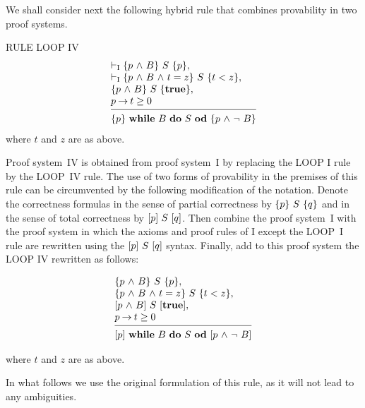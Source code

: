 \documentclass[runningheads]{llncs}       %
\begin{document}
We shall consider next the following hybrid rule that combines provability in two
proof systems.
\III

\NI
RULE LOOP IV
\[
 \begin{array}{l}
  \vdash_{\rm{I}}  \HT{p \A B}{S}{p},             \\
  \vdash_{\rm{I}}   \HT{p \A B \A t=z}{S}{t<z},   \\
  \HT{p \A B}{S}{\mathbf{true}},                  \\
  p \ra t \geq 0                                 \\
  [-\medskipamount]
  \hrulefill                                      \\
  \HT{p}{\WDD{B}{S}}{p \A \neg\ B}
 \end{array}
\]
%
\NI
where $t$ and $z$ are as above.
\III

Proof system~IV is obtained from proof system~I by replacing the LOOP
I rule by the LOOP~IV rule. The use of two forms of provability in the
premises of this rule can be circumvented by the following
modification of the notation.  Denote the correctness
formulas in the sense of partial correctness by $\mbox{$\{{p}\}\ {S}\ \{{q}\}$}$ and in
the sense of total correctness by $[{p}]\ {S}\ [{q}]$. Then combine the
proof system~I with the proof system in which the axioms and proof
rules of I except the LOOP~I rule are rewritten using the
$[{p}]\ {S}\ [{q}]$ syntax. Finally, add to this proof system the LOOP IV
rewritten as follows:
\III

\[
 \begin{array}{l}
  \HT{p \A B}{S}{p},                      \\
  \HT{p \A B \A t=z}{S}{t<z},             \\
  \HTT{p \A B}{S}{\mathbf{true}},         \\
  p \ra t \geq 0                         \\
  [-\medskipamount]
  \hrulefill                              \\
  \HTT{p}{\WDD{B}{S}}{p \A \neg\ B}
 \end{array}
\]

\NI
where $t$ and $z$ are as above.
\III

In what follows we use the original formulation of this rule, 
as it will not lead to any ambiguities.


\end{document}

